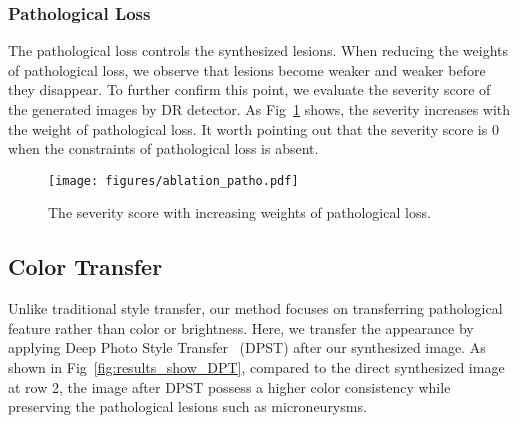\documentclass[letterpaper]{article} %
\begin{document}
    \subsubsection{Pathological Loss}

    The pathological loss controls the synthesized lesions. When reducing the weights of pathological loss, we observe that lesions become weaker and weaker before they disappear. To further confirm this point, we evaluate the severity score of the generated images by DR detector. As Fig~\ref{fig:ablation_patho} shows, the severity increases with the weight of pathological loss. It worth pointing out that the severity score is $0$ when the constraints of pathological loss is absent.


	\begin{figure}[h!]
		\begin{center}
			\texttt{[image: figures/ablation\_patho.pdf]}
		\end{center}
		\caption{The severity score with increasing weights of pathological loss.}
		\label{fig:ablation_patho}
	\end{figure}



        \subsection{Color Transfer}

        Unlike traditional style transfer,  our method focuses on transferring pathological feature rather than color or brightness. Here, we transfer the appearance by applying Deep Photo Style Transfer~\cite{DBLP:conf/cvpr/LuanPSB17} (DPST) after our synthesized image. As shown in Fig~\ref{fig:results_show_DPT}, compared to the direct synthesized image at row 2, the image after DPST possess a higher color consistency while preserving the  pathological lesions such as microneurysms.





\end{document}
